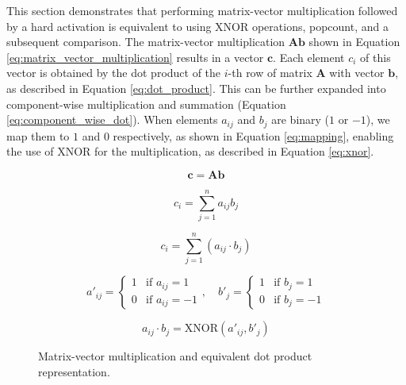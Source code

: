 \documentclass[conference]{IEEEtran}
\begin{document}
This section demonstrates that performing matrix-vector multiplication followed by a hard activation is equivalent to using XNOR operations, popcount, and a subsequent comparison.
The matrix-vector multiplication \(\mathbf{A} \mathbf{b}\) shown in Equation \ref{eq:matrix_vector_multiplication} results in a vector \(\mathbf{c}\). Each element \(c_i\) of this vector is obtained by the dot product of the \(i\)-th row of matrix \(\mathbf{A}\) with vector \(\mathbf{b}\), as described in Equation \ref{eq:dot_product}. This can be further expanded into component-wise multiplication and summation (Equation \ref{eq:component_wise_dot}). When elements \(a_{ij}\) and \(b_j\) are binary (\(1\) or \(-1\)), we map them to \(1\) and \(0\) respectively, as shown in Equation \ref{eq:mapping}, enabling the use of XNOR for the multiplication, as described in Equation \ref{eq:xnor}.

\begin{figure}[h]
    \centering
    \begin{equation}
    \mathbf{c} = \mathbf{A} \mathbf{b}
    \label{eq:matrix_vector_multiplication}
    \end{equation}

    \begin{equation}
    c_i = \sum_{j=1}^n a_{ij} b_j
    \label{eq:dot_product}
    \end{equation}

    \begin{equation}
    c_i = \sum_{j=1}^n (a_{ij} \cdot b_j)
    \label{eq:component_wise_dot}
    \end{equation}

    \begin{equation}
    a'_{ij} = \begin{cases}
    1 & \text{if } a_{ij} = 1 \\
    0 & \text{if } a_{ij} = -1
    \end{cases}, \quad
    b'_j = \begin{cases}
    1 & \text{if } b_j = 1 \\
    0 & \text{if } b_j = -1
    \end{cases}
    \label{eq:mapping}
    \end{equation}

    \begin{equation}
    a_{ij} \cdot b_j = \text{XNOR}(a'_{ij}, b'_j)
    \label{eq:xnor}
    \end{equation}

    \caption{Matrix-vector multiplication and equivalent dot product representation.}
    \label{fig:matrix_vector_multiplication}
\end{figure}
\end{document}
